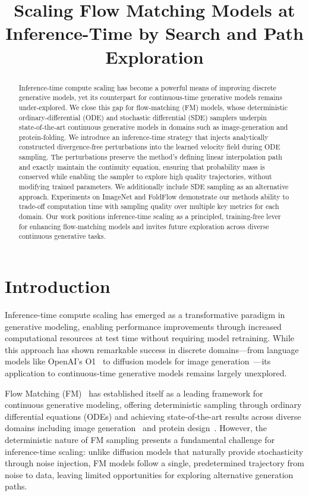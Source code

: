 \documentclass{article}
\title{Scaling Flow Matching Models at Inference-Time by Search and Path Exploration}
\begin{document}
\maketitle


\begin{abstract}
Inference‑time compute scaling has become a powerful means of improving discrete generative models, yet its counterpart for continuous‑time generative models remains under‑explored. We close this gap for flow‑matching (FM) models, whose deterministic ordinary‑differential (ODE) and stochastic differential (SDE) samplers underpin state‑of‑the‑art continuous generative models in domains such as image‑generation and protein‑folding. We introduce an inference‑time strategy that injects analytically constructed divergence‑free perturbations into the learned velocity field during ODE sampling. The perturbations preserve the method's defining linear interpolation path and exactly maintain the continuity equation, ensuring that probability mass is conserved while enabling the sampler to explore high quality trajectories, without modifying trained parameters. We additionally include SDE sampling as an alternative approach. Experiments on ImageNet and FoldFlow demonstrate our methods ability to trade-off computation time with sampling quality over multiple key metrics for each domain. Our work positions inference‑time scaling as a principled, training‑free lever for enhancing flow‑matching models and invites future exploration across diverse continuous generative tasks.
\end{abstract}


\section{Introduction}

Inference-time compute scaling has emerged as a transformative paradigm in generative modeling, enabling performance improvements through increased computational resources at test time without requiring model retraining. While this approach has shown remarkable success in discrete domains—from language models like OpenAI's O1~\cite{openai2024o1} to diffusion models for image generation~\cite{ma2025diffits}—its application to continuous-time generative models remains largely unexplored.

Flow Matching (FM)~\cite{lipman2023fm} has established itself as a leading framework for continuous generative modeling, offering deterministic sampling through ordinary differential equations (ODEs) and achieving state-of-the-art results across diverse domains including image generation~\cite{esser2024scaling} and protein design~\cite{wu2024foldflow}. However, the deterministic nature of FM sampling presents a fundamental challenge for inference-time scaling: unlike diffusion models that naturally provide stochasticity through noise injection, FM models follow a single, predetermined trajectory from noise to data, leaving limited opportunities for exploring alternative generation paths.
\end{document}

